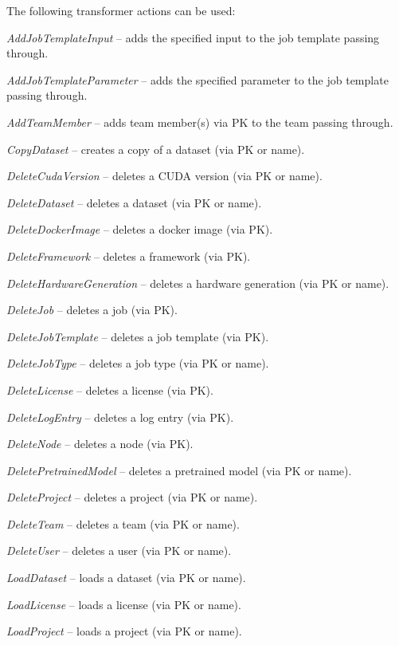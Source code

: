 \documentclass[a4paper]{book}
\begin{document}
The following transformer actions can be used:
\begin{tight_itemize}
  \item \textit{AddJobTemplateInput} -- adds the specified input to the job template passing through.
  \item \textit{AddJobTemplateParameter} -- adds the specified parameter to the job template passing through.
  \item \textit{AddTeamMember} -- adds team member(s) via PK to the team passing through.
  \item \textit{CopyDataset} -- creates a copy of a dataset (via PK or name).
  \item \textit{DeleteCudaVersion} -- deletes a CUDA version (via PK or name).
  \item \textit{DeleteDataset} -- deletes a dataset (via PK or name).
  \item \textit{DeleteDockerImage} -- deletes a docker image (via PK).
  \item \textit{DeleteFramework} -- deletes a framework (via PK).
  \item \textit{DeleteHardwareGeneration} -- deletes a hardware generation (via PK or name).
  \item \textit{DeleteJob} -- deletes a job (via PK).
  \item \textit{DeleteJobTemplate} -- deletes a job template (via PK).
  \item \textit{DeleteJobType} -- deletes a job type (via PK or name).
  \item \textit{DeleteLicense} -- deletes a license (via PK).
  \item \textit{DeleteLogEntry} -- deletes a log entry (via PK).
  \item \textit{DeleteNode} -- deletes a node (via PK).
  \item \textit{DeletePretrainedModel} -- deletes a pretrained model (via PK or name).
  \item \textit{DeleteProject} -- deletes a project (via PK or name).
  \item \textit{DeleteTeam} -- deletes a team (via PK or name).
  \item \textit{DeleteUser} -- deletes a user (via PK or name).
  \item \textit{LoadDataset} -- loads a dataset (via PK or name).
  \item \textit{LoadLicense} -- loads a license (via PK or name).
  \item \textit{LoadProject} -- loads a project (via PK or name).

\end{tight_itemize}
\end{document}
